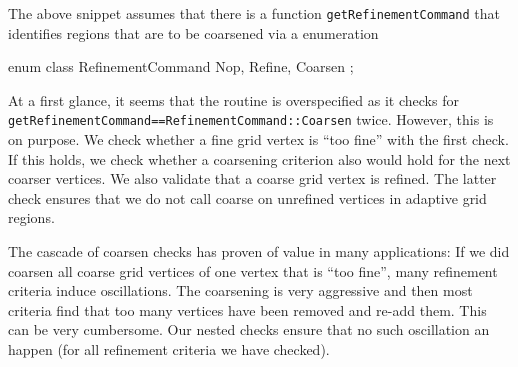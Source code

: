 \noindent
The above snippet assumes that there is a function \texttt{getRefinementCommand} that identifies
  regions that are to be coarsened via a enumeration
  \begin{code}
  enum class RefinementCommand {
    Nop, Refine, Coarsen
  };
  \end{code}
\noindent

At a first glance, it seems that the routine is overspecified as it checks for
\linebreak
\texttt{getRefinementCommand==RefinementCommand::Coarsen} twice. However, this
is on purpose. 
We check whether a fine grid vertex is ``too fine'' with the first check.
If this holds, we check whether a coarsening criterion also would hold for the
next coarser vertices.
We also validate that a coarse grid vertex is refined.
The latter check ensures that we do not call coarse on unrefined vertices in
adaptive grid regions.

The cascade of coarsen checks has proven of value in many applications: If we
did coarsen all coarse grid vertices of one vertex that is ``too fine'', many
refinement criteria induce oscillations.
The coarsening is very aggressive and then most criteria find that too many
vertices have been removed and re-add them.
This can be very cumbersome.
Our nested checks ensure that no such oscillation an happen (for all refinement
criteria we have checked).
